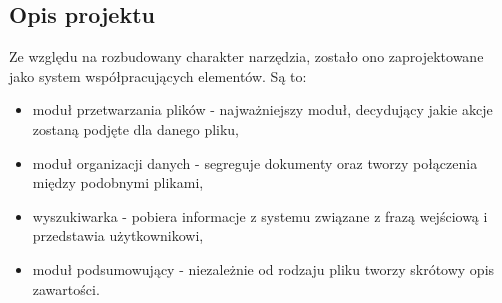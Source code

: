 \documentclass[12pt,a4paper,twoside]{article}
\begin{document}
\subsection{Opis projektu}
Ze względu na rozbudowany charakter narzędzia, zostało ono zaprojektowane jako system współpracujących elementów. Są to:
\begin{itemize}
	\item moduł przetwarzania plików - najważniejszy moduł, decydujący jakie akcje zostaną podjęte dla danego pliku,
	\item moduł organizacji danych - segreguje dokumenty oraz tworzy połączenia między podobnymi plikami,
	\item wyszukiwarka - pobiera informacje z systemu związane z frazą wejściową i przedstawia użytkownikowi,
	\item moduł podsumowujący - niezależnie od rodzaju pliku tworzy skrótowy opis zawartości.
\end{itemize}\par
\end{document}
